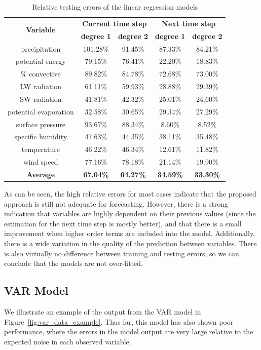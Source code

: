 \documentclass{article} %
\begin{document}
\begin{table}[htbp]
  \centering
    \begin{tabular}{ccccc}
    \toprule
    \multirow{2}[2]{*}{\textbf{Variable}} & \multicolumn{2}{c}{\textbf{Current time step}} & \multicolumn{2}{c}{\textbf{Next time step}} \\
          & \textbf{degree 1} & \textbf{degree 2} & \textbf{degree 1} & \textbf{degree 2} \\
    \midrule
    precipitation & 101.28\% & 91.45\% & 87.33\% & 84.21\% \\
    potential energy & 79.15\% & 76.41\% & 22.20\% & 18.83\% \\
    \% convective & 89.82\% & 84.78\% & 72.68\% & 73.00\% \\
    LW radiation & 61.11\% & 59.93\% & 28.88\% & 29.39\% \\
    SW radiation & 41.81\% & 42.32\% & 25.01\% & 24.60\% \\
    potential evaporation & 32.58\% & 30.65\% & 29.34\% & 27.29\% \\
    surface pressure & 93.67\% & 88.34\% & 8.60\% & 8.52\% \\
    specific humidity & 47.63\% & 44.35\% & 38.11\% & 35.48\% \\
    temperature & 46.22\% & 46.34\% & 12.61\% & 11.82\% \\
    wind speed & 77.16\% & 78.18\% & 21.14\% & 19.90\% \\
    \textbf{Average} & \textbf{67.04\%} & \textbf{64.27\%} & \textbf{34.59\%} & \textbf{33.30\%} \\
    \bottomrule
    \end{tabular}%
  \caption{Relative testing errors of the linear regression models}
  \label{fig:lin_reg_testing_error}%
\end{table}%

As can be seen, the high relative errors for most cases indicate that the proposed approach is still not adequate for forecasting. However, there is a strong indication that variables are highly dependent on their previous values (since the estimation for the next time step is mostly better), and that there is a small improvement when higher order terms are included into the model. Additionally, there is a wide variation in the quality of the prediction between variables. There is also virtually no difference between training and testing errors, so we can conclude that the models are not over-fitted.

\subsection{VAR Model}
We illustrate an example of the output from the VAR model in Figure~\ref{fig:var_data_example}. Thus far, this model has also shown poor performance, where the errors in the model output are very large relative to the expected noise in each observed variable.
\end{document}

